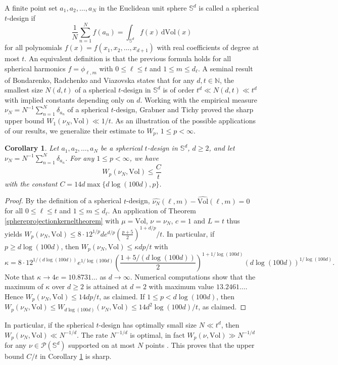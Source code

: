 \documentclass[11pt,a4paper]{article}
\newtheorem{cor}[thm]{Corollary}
\theoremstyle{definition}
\begin{document}
A finite point set $a_1, a_2, \ldots, a_N$ in the Euclidean unit sphere $\mathbb{S}^d$ is called a spherical $t$-design if
\[ \frac{1}{N} \sum_{n=1}^N f(a_n) = \int_{\mathbb{S}^d} f(x) \, \mathrm{d}\mathrm{Vol}(x) \]
for all polynomials $f(x)=f(x_1, x_2, \ldots, x_{d+1})$ with real coefficients of degree at most $t$. An equivalent definition is that the previous formula holds for all spherical harmonics $f=\phi_{\ell,m}$ with $0 \le \ell \le t$ and $1 \le m \le d_{\ell}$. A seminal result of Bondarenko, Radchenko and Viazovska \cite{BRV} states that for any $d,t \in \mathbb{N}$, the smallest size $N(d,t)$ of a spherical $t$-design in $\mathbb{S}^d$ is of order $t^d \ll N(d,t) \ll t^d$ with implied constants depending only on $d$. Working with the empirical measure $\nu_N=N^{-1} \sum_{n=1}^N \delta_{a_n}$ of a spherical $t$-design, Grabner and Tichy \cite{GT} proved the sharp upper bound $W_1 (\nu_N, \mathrm{Vol}) \ll 1/t$. As an illustration of the possible applications of our results, we generalize their estimate to $W_p$, $1 \le p < \infty$.
\begin{cor}\label{sphericaldesigntheorem} Let $a_1, a_2, \ldots, a_N$ be a spherical $t$-design in $\mathbb{S}^d$, $d \ge 2$, and let $\nu_N=N^{-1} \sum_{n=1}^N \delta_{a_n}$. For any $1 \le p < \infty$, we have
\[ W_p \left( \nu_N , \mathrm{Vol} \right) \le \frac{C}{t} \]
with the constant $C=14d \max \{ d \log (100d), p \}$.
\end{cor}

\begin{proof} By the definition of a spherical $t$-design, $\widehat{\nu_N}(\ell,m) - \widehat{\mathrm{Vol}}(\ell,m)=0$ for all $0 \le \ell \le t$ and $1 \le m \le d_{\ell}$. An application of Theorem \ref{sphereprojectionkerneltheorem} with $\mu=\mathrm{Vol}$, $\nu = \nu_N$, $c=1$ and $L=t$ thus yields $W_p (\nu_N, \mathrm{Vol}) \le 8 \cdot 12^{1/p} d e^{d/p} \left( \frac{p+5}{2} \right)^{1+d/p}/t$. In particular, if $p \ge d \log (100d)$, then $W_p (\nu_N, \mathrm{Vol}) \le \kappa d p/t$ with
\[ \kappa = 8 \cdot 12^{1/(d \log (100d))} e^{1/\log (100d)} \left( \frac{1+5/(d \log (100d))}{2} \right)^{1+1/\log (100d)} (d \log (100d))^{1/\log (100d)} . \]
Note that $\kappa \to 4e=10.8731\ldots$ as $d \to \infty$. Numerical computations show that the maximum of $\kappa$ over $d \ge 2$ is attained at $d=2$ with maximum value $13.2461\ldots$. Hence $W_p (\nu_N, \mathrm{Vol}) \le 14dp/t$, as claimed. If $1 \le p < d \log (100d)$, then $W_p (\nu_N, \mathrm{Vol}) \le W_{d \log (100d)}(\nu_N, \mathrm{Vol}) \le 14 d^2 \log (100d)/t$, as claimed.
\end{proof}
In particular, if the spherical $t$-design has optimally small size $N \ll t^d$, then $W_p (\nu_N, \mathrm{Vol}) \ll N^{-1/d}$. The rate $N^{-1/d}$ is optimal, in fact $W_p(\nu, \mathrm{Vol}) \gg N^{-1/d}$ for any $\nu \in \mathcal{P}(\mathbb{S}^d)$ supported on at most $N$ points \cite{KL}. This proves that the upper bound $C/t$ in Corollary \ref{sphericaldesigntheorem} is sharp.
\end{document}
